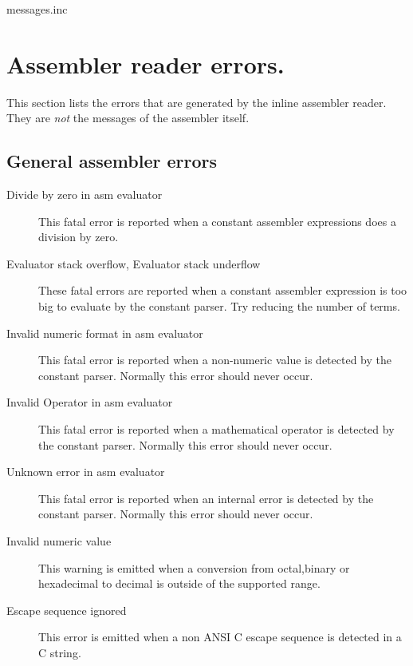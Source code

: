  {messages.inc}

\section{Assembler reader errors.}

This section lists the errors that are generated by the inline assembler reader.
They are {\em not} the messages of the assembler itself.

\subsection{General assembler errors}
\begin{description}
\item [Divide by zero in asm evaluator]
This fatal error is reported when a constant assembler expressions
does a division by zero.

\item [Evaluator stack overflow, Evaluator stack underflow]
These fatal errors are reported when a constant assembler expression
is too big to evaluate by the constant parser. Try reducing the
number of terms.

\item [Invalid numeric format in asm evaluator]
This fatal error is reported when a non-numeric value is detected
by the constant parser. Normally this error should never occur.

\item [Invalid Operator in asm evaluator]
This fatal error is reported when a mathematical operator is detected
by the constant parser. Normally this error should never occur.

\item [Unknown error in asm evaluator]
This fatal error is reported when an internal error is detected
by the constant parser. Normally this error should never occur.

\item [Invalid numeric value]
This warning is emitted when a conversion from octal,binary or hexadecimal
to decimal is outside of the supported range.

\item [Escape sequence ignored]
This error is emitted when a non ANSI C escape sequence is detected in
a C string.


\end{description}
